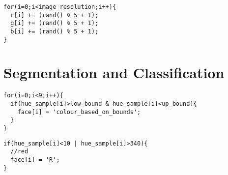 \begin{verbatim}
for(i=0;i<image_resolution;i++){
  r[i] += (rand() % 5 + 1);
  g[i] += (rand() % 5 + 1);
  b[i] += (rand() % 5 + 1);
}
\end{verbatim}

\section{Segmentation and Classification}

\begin{verbatim}
for(i=0;i<9;i++){
  if(hue_sample[i]>low_bound & hue_sample[i]<up_bound){    
    face[i] = 'colour_based_on_bounds';
  }
}
\end{verbatim}

\begin{verbatim}
if(hue_sample[i]<10 | hue_sample[i]>340){    
  //red
  face[i] = 'R';
}
\end{verbatim}

